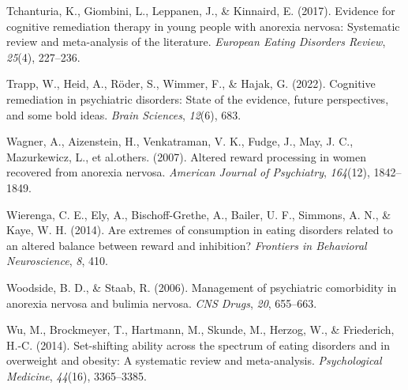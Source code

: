 \documentclass[
  man,floatsintext]{apa6}
\newlength{\cslhangindent}
\newlength{\cslentryspacingunit} %
\newenvironment{CSLReferences}[2] %
 {%
  \setlength{\parindent}{0pt}
  \ifodd #1
  \let\oldpar\par
  \def\par{\hangindent=\cslhangindent\oldpar}
  \fi
  \setlength{\parskip}{#2\cslentryspacingunit}
 }%
 {}
\begin{document}
\begin{CSLReferences}{1}{0}
\leavevmode{}%
Tchanturia, K., Giombini, L., Leppanen, J., \& Kinnaird, E. (2017). Evidence for cognitive remediation therapy in young people with anorexia nervosa: Systematic review and meta-analysis of the literature. \emph{European Eating Disorders Review}, \emph{25}(4), 227--236.

\leavevmode{}%
Trapp, W., Heid, A., Röder, S., Wimmer, F., \& Hajak, G. (2022). Cognitive remediation in psychiatric disorders: State of the evidence, future perspectives, and some bold ideas. \emph{Brain Sciences}, \emph{12}(6), 683.

\leavevmode{}%
Wagner, A., Aizenstein, H., Venkatraman, V. K., Fudge, J., May, J. C., Mazurkewicz, L., et al.others. (2007). Altered reward processing in women recovered from anorexia nervosa. \emph{American Journal of Psychiatry}, \emph{164}(12), 1842--1849.

\leavevmode{}%
Wierenga, C. E., Ely, A., Bischoff-Grethe, A., Bailer, U. F., Simmons, A. N., \& Kaye, W. H. (2014). Are extremes of consumption in eating disorders related to an altered balance between reward and inhibition? \emph{Frontiers in Behavioral Neuroscience}, \emph{8}, 410.

\leavevmode{}%
Woodside, B. D., \& Staab, R. (2006). Management of psychiatric comorbidity in anorexia nervosa and bulimia nervosa. \emph{CNS Drugs}, \emph{20}, 655--663.

\leavevmode{}%
Wu, M., Brockmeyer, T., Hartmann, M., Skunde, M., Herzog, W., \& Friederich, H.-C. (2014). Set-shifting ability across the spectrum of eating disorders and in overweight and obesity: A systematic review and meta-analysis. \emph{Psychological Medicine}, \emph{44}(16), 3365--3385.

\end{CSLReferences}
\end{document}
